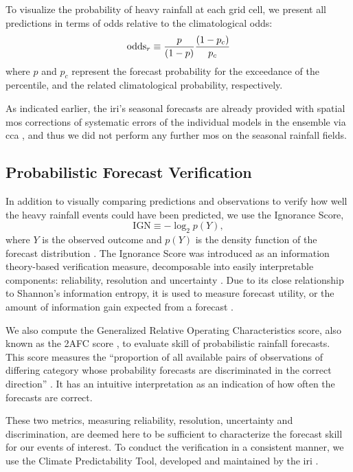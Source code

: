 \documentclass{ametsoc}
\begin{document}
To visualize the probability of heavy rainfall at each grid cell, we present all predictions in terms of odds relative to the climatological odds:
\begin{equation} \label{eq:odds-ratio}
	\text{odds}_{r} \equiv \frac{p}{\qty(1 - p)} \frac{\qty(1 - p_c)}{p_c}
\end{equation}
where $p$ and $p_c$ represent the forecast probability for the exceedance of the  percentile, and the related climatological probability, respectively.

As indicated earlier, the \gls{iri}'s seasonal forecasts are already provided with spatial \gls{mos} corrections of systematic errors of the individual models in the ensemble via \gls{cca} \citep{Barnston2010}, and thus we did not perform any further \gls{mos} on the seasonal rainfall fields.

\subsection{Probabilistic Forecast Verification}

In addition to visually comparing predictions and observations to verify how well the heavy rainfall events could have been predicted, we use the Ignorance Score,
\begin{equation}\label{eq:ignorance}
	\text{IGN} \equiv - \log_2 p(Y),
\end{equation}
where $Y$ is the observed outcome and $p(Y)$ is the density function of the forecast distribution \citep{Good1952,Roulston2002,Brocker2007}.
The Ignorance Score was introduced as an information theory-based verification measure,  decomposable into easily interpretable components: reliability, resolution and uncertainty \citep{Weijs2010}.
Due to its close relationship to Shannon's information entropy, it is used to measure forecast utility, or the amount of information gain expected from a forecast \citep{Roulston2002}.

We also compute the Generalized Relative Operating Characteristics score, also known as the 2AFC score \citep{Mason2009}, to evaluate skill of probabilistic rainfall forecasts.
This score measures the ``proportion of all available pairs of observations of differing category whose probability forecasts are discriminated in the correct direction'' \citep{Mason2009}.
It has an intuitive interpretation as an indication of how often the forecasts are correct.

These two metrics, measuring reliability, resolution, uncertainty and discrimination, are deemed here to be sufficient to characterize the forecast skill for our events of interest.
To conduct the verification in a consistent manner, we use the Climate Predictability Tool, developed and maintained by the \gls{iri} \citep{Mason2017}.
\end{document}
